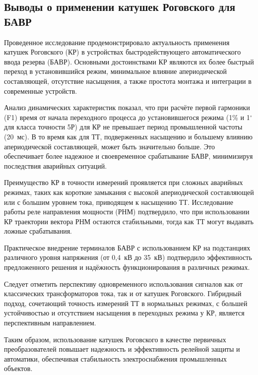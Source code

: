 \subsection{Выводы о применении катушек Роговского для БАВР}
\label{sec:ch02_conclusions_rogowski}

Проведенное исследование продемонстрировало актуальность применения катушек Роговского (КР) в устройствах быстродействующего автоматического ввода резерва (БАВР). Основными достоинствами КР являются их более быстрый переход в установившийся режим, минимальное влияние апериодической составляющей, отсутствие насыщения, а также простота монтажа и интеграции в современные устройств.

Анализ динамических характеристик показал, что при расчёте первой гармоники (F1) время от начала переходного процесса до установившегося режима (1\% и 1$^\circ$ для класса точности 5Р) для КР не превышает период промышленной частоты (20~мс). В то время как для ТТ, подверженных насыщению и большему влиянию апериодической составляющей, может быть значительно больше. Это обеспечивает более надежное и своевременное срабатывание БАВР, минимизируя последствия аварийных ситуаций.

Преимущество КР в точности измерений проявляется при сложных аварийных режимах, таких как короткие замыкания с высокой апериодической составляющей или с большим уровнем тока, приводящем к насыщению ТТ. Исследование работы реле направления мощности (РНМ) подтвердило, что при использовании КР траектории вектора РНМ остаются стабильными, тогда как ТТ могут выдавать ложные срабатывания.

Практическое внедрение терминалов БАВР с использованием КР на подстанциях различного уровня напряжения (от 0,4~кВ до 35~кВ) подтвердило эффективность предложенного решения и надёжность функционирования в различных режимах.

Следует отметить перспективу одновременного использования сигналов как от классических трансформаторов тока, так и от катушек Роговского. Гибридный подход, сочетающий точность измерений ТТ в нормальных режимах, с большей устойчивостью и отсутствием насыщения в переходных режима у КР, является перспективным направлением.

Таким образом, использование катушек Роговского в качестве первичных преобразователей повышает надежность и эффективность релейной защиты и автоматики, обеспечивая стабильность электроснабжения промышленных объектов.

